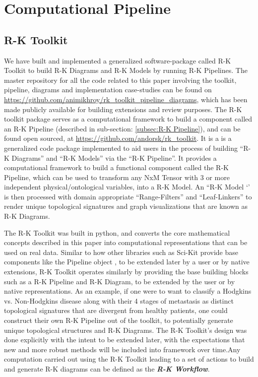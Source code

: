 \section{Computational Pipeline}

\subsection{R-K Toolkit}
\label{subsec:R-K Toolkit}

 We have built and implemented a generalized software-package called R-K Toolkit \cite{rktoolkit} to build R-K Diagrams and R-K Models by running R-K Pipelines. The master repository for all the code related to this paper involving the toolkit, pipeline, diagrams and implementation case-studies can be found on \url{https://github.com/animikhroy/rk_toolkit_pipeline_diagrams}, which has been made publicly available for building extensions and review purposes. The R-K toolkit package serves as a computational framework to build a component called an R-K Pipeline (described in sub-section: \ref{subsec:R-K Pipeline}), and can be found open sourced, at \url{https://github.com/andorsk/rk_toolkit}. It is a is a generalized code package implemented to aid users in the process of building “R-K Diagrams” and “R-K Models” via the “R-K Pipeline”. It provides a computational framework to build a functional component called the R-K Pipeline, which can be used to transform any NxM Tensor with 3 or more independent physical/ontological variables, into a R-K Model. An “R-K Model ‘’ is then processed with domain appropriate “Range-Filters” and “Leaf-Linkers” to render unique topological signatures and graph visualizations that are known as R-K Diagrams.
 
 The R-K Toolkit was built in python, and converts the core mathematical concepts described in this paper into computational representations that can be used on real data. Similar to how other libraries such as Sci-Kit \cite{a2021_scikitlearn} provide base components like the Pipeline object \cite{a2021_61}, to be extended later by a user or by native extensions, R-K Toolkit operates similarly by providing the base building blocks such as a R-K Pipeline and R-K Diagram, to be extended by the user or by native representations. As an example, if one were to want to classify a Hodgkins vs. Non-Hodgkins disease along with their 4 stages of metastasis as distinct topological signatures that are divergent from healthy patients, one could construct their own R-K Pipeline out of the toolkit, to potentially generate unique topological structures and R-K Diagrams. The R-K Toolkit's design was done explicitly with the intent to be extended later, with the expectations that new and more robust methods will be included into framework over time.Any computation carried out using the R-K Toolkit leading to a set of actions to build and generate R-K diagrams can be defined as the \textbf{\textit{R-K Workflow}}.

